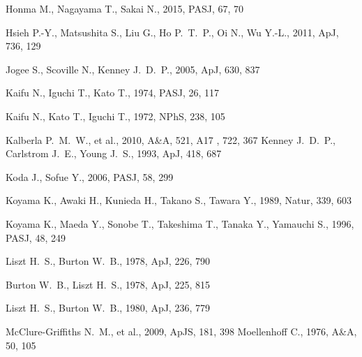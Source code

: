 \documentclass[useAMS,usenatbib]{mn2e}
\begin{document}
\begin{thebibliography}{}
 Honma M., Nagayama T., Sakai N., 2015, PASJ, 67, 70 
 
 Hsieh P.-Y., Matsushita S., Liu G., Ho P.~T.~P., Oi N., Wu Y.-L., 2011, ApJ, 736, 129 %

 Jogee S., Scoville N., Kenney J.~D.~P., 2005, ApJ, 630, 837 %

 Kaifu N., Iguchi T., Kato T., 1974, PASJ, 26, 117 

 Kaifu N., Kato T., Iguchi T., 1972, NPhS, 238, 105 

 Kalberla P.~M.~W., et al., 2010, A\&A, 521, A17 %
  , 722, 367 
 Kenney J.~D.~P., Carlstrom J.~E., Young J.~S., 1993, ApJ, 418, 687  

 Koda J., Sofue Y., 2006, PASJ, 58, 299 

 Koyama K., Awaki H., Kunieda H., Takano S., Tawara Y., 1989, Natur, 339, 603  

 Koyama K., Maeda Y., Sonobe T., Takeshima T., Tanaka Y., Yamauchi S., 1996, PASJ, 48, 249  

 Liszt H.~S., Burton W.~B., 1978, ApJ, 226, 790  

 Burton W.~B., Liszt H.~S., 1978, ApJ, 225, 815  

 Liszt H.~S., Burton W.~B., 1980, ApJ, 236, 779  

 McClure-Griffiths N.~M., et al., 2009, ApJS, 181, 398 %
 Moellenhoff C., 1976, A\&A, 50, 105  


\end{thebibliography}
\end{document}
